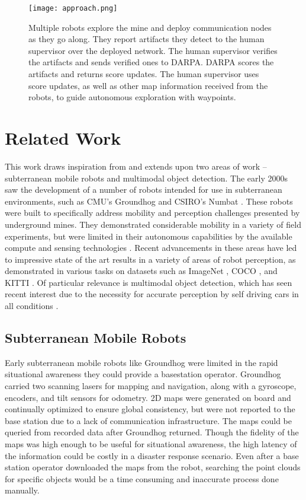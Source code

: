 \begin{figure}	
	\centering
	\texttt{[image: approach.png]}
	\caption[Our approach]{Multiple robots explore the mine and deploy communication nodes as they go along. They report artifacts they detect to the human supervisor over the deployed network. The human supervisor verifies the artifacts and sends verified ones to DARPA. DARPA scores the artifacts and returns score updates. The human supervisor uses score updates, as well as other map information received from the robots, to guide autonomous exploration with waypoints.}
	\label{approach}
\end{figure}

\section{Related Work}

This work draws inspiration from and extends upon two areas of work -- subterranean mobile robots and multimodal object detection. The early 2000s saw the development of a number of robots intended for use in subterranean environments, such as CMU's Groundhog \cite{ferguson2004autonomous} and CSIRO's Numbat \cite{ralston1998numbat}. These robots were built to specifically address mobility and perception challenges presented by underground mines. They demonstrated considerable mobility in a variety of field experiments, but were limited in their autonomous capabilities by the available compute and sensing technologies \cite{morris2006recent}. Recent advancements in these areas have led to impressive state of the art results in a variety of areas of robot perception, as demonstrated in various tasks on datasets such as ImageNet \cite{deng2009imagenet}, COCO \cite{lin2014microsoft}, and KITTI \cite{Geiger2013IJRR}. Of particular relevance is multimodal object detection, which has seen recent interest due to the necessity for accurate perception by self driving cars in all conditions \cite{feng2019deep}.

\subsection{Subterranean Mobile Robots}

Early subterranean mobile robots like Groundhog were limited in the rapid situational awareness they could provide a basestation operator. Groundhog carried two scanning lasers for mapping and navigation, along with a gyroscope, encoders, and tilt sensors for odometry. 2D maps were generated on board and continually optimized to ensure global consistency, but were not reported to the base station due to a lack of communication infrastructure. The maps could be queried from recorded data after Groundhog returned. Though the fidelity of the maps was high enough to be useful for situational awareness, the high latency of the information could be costly in a disaster response scenario. Even after a base station operator downloaded the maps from the robot, searching the point clouds for specific objects would be a time consuming and inaccurate process done manually.

